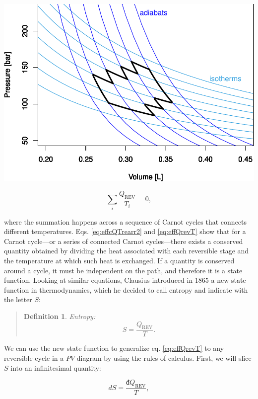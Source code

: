 \documentclass[
  9pt,
]{extbook}
\theoremstyle{definition}
\newtheorem{definition}{Definition}[chapter]
\theoremstyle{definition}
\theoremstyle{definition}
\theoremstyle{definition}
\theoremstyle{remark}
\begin{document}
\begin{center}\includegraphics[width=0.7\linewidth]{pchem1_files/figure-latex/unnamed-chunk-12-1} \end{center}

\begin{equation}
\sum_i \frac{Q_{\mathrm{REV}}}{T_i} = 0,
\label{eq:effQrevT}
\end{equation}

where the summation happens across a sequence of Carnot cycles that connects different temperatures. Eqs. \eqref{eq:effcQTrearr2} and \eqref{eq:effQrevT} show that for a Carnot cycle---or a series of connected Carnot cycles---there exists a conserved quantity obtained by dividing the heat associated with each reversible stage and the temperature at which such heat is exchanged. If a quantity is conserved around a cycle, it must be independent on the path, and therefore it is a state function. Looking at similar equations, Clausius introduced in 1865 a new state function in thermodynamics, which he decided to call entropy and indicate with the letter \(S\):

\begin{quote}
\begin{definition}
\protect\hypertarget{def:entropy}{}\label{def:entropy}\emph{Entropy:} \begin{equation}
S = \frac{Q_{\mathrm{REV}}}{T}.
\end{equation}
\end{definition}
\end{quote}

We can use the new state function to generalize eq. \eqref{eq:effQrevT} to any reversible cycle in a \(PV\)-diagram by using the rules of calculus. First, we will slice \(S\) into an infinitesimal quantity:

\begin{equation}
dS = \frac{đQ_{\mathrm{REV}}}{T},
\label{eq:dentropy}
\end{equation}
\end{document}

